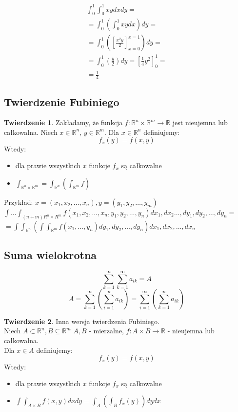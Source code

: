 \documentclass{article}
\theoremstyle{definition}
\theoremstyle{definition}
\newtheorem{tw}{Twierdzenie}[subsection]
\theoremstyle{definition}
\theoremstyle{definition}
\begin{document}
\begin{align}
    \int_{0}^{1} \int_{0}^{1} xy dx dy =\\
    =\int_{0}^{1} \left(\int_{0}^{1} xy dx \right) dy=\\
    =\int_{0}^{1} \left(\left[\frac{x^2y}{2}\right]_{x=0}^{x=1}\right) dy=\\
    =\int_{0}^{1} \left(\frac{y}{2}\right) dy = \left[\frac{1}{4} y^2\right]_{0}^{1}=\\
    =\frac{1}{4} 
\end{align}

\subsection{Twierdzenie Fubiniego}

\begin{tw}
    Zakładamy, że funkcja $f:\mathbb{R}^n \times \mathbb{R}^m \rightarrow \mathbb{R}$
    jest nieujemna lub całkowalna. Niech $x\in\mathbb{R}^n$, $y\in\mathbb{R}^m$. Dla $x\in\mathbb{R}^n$ definiujemy:
    \[f_x(y) = f(x,y)\]
    Wtedy:
    \begin{itemize}
        \item dla prawie wszystkich $x$ funkcje $f_x$ są całkowalne
        \item $\int_{\mathbb{R}^n\times\mathbb{R}^m} = \int_{\mathbb{R}^n} \left(\int_{\mathbb{R}^m} f\right)$
    \end{itemize}
\end{tw}

Przykład:
$x=(x_1,x_2,\dots,x_n), y=(y_1,y_2,\dots, y_m)$\\
$\int \dots \int_{(n+m) R^n\times R^m} f(x_1,x_2,\dots,x_n,y_1,y_2,\dots,y_n) dx_1, dx_2 \dots, dy_1, dy_2, \dots, dy_n =$\\
$=\int \int_{\mathbb{R}^n} \left(\int \int_{\mathbb{R}^m} f(x_1,\dots, y_n) dy_1, dy_2, \dots, dy_n\right) dx_1, dx_2, \dots, dx_n$

\subsection{Suma wielokrotna}
\[\sum_{k=1}^{\infty}\sum_{k=1}^{\infty} a_{ik} = A\]
\[A=\sum_{k=1}^{\infty}\left(\sum_{i=1}^{\infty} a_{ik}\right)= \sum_{i=1}^{\infty}\left(\sum_{k=1}^{\infty} a_{ik}\right)\]

\begin{tw}
    Inna wersja twierdzenia Fubiniego.\\
    Niech $A\subset \mathbb{R}^n, B\subseteq \mathbb{R}^m$
    $A, B$ - mierzalne,
    $f: A\times B \rightarrow \mathbb{R}$ - nieujemna lub całkowalna.\\
    Dla $x\in A$ definiujemy:
    \[f_x(y) = f(x,y)\]
    Wtedy:
    \begin{itemize}
        \item dla prawie wszystkich $x$ funkcje $f_x$ są całkowalne
        \item $\int \int_{A\times B} f(x,y) dx dy = \int_A \left(\int_B f_x(y) \right) dy dx$
    \end{itemize}
\end{tw}
\end{document}
